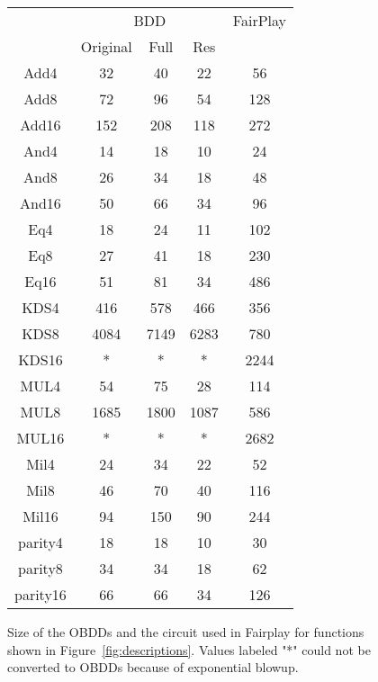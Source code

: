 %
\begin{figure}


\begin{center}\begin{tabular}{|c||c|c|c||c|}
\hline 
&
\multicolumn{3}{c||}{BDD}&
FairPlay\tabularnewline
&
{\sf Original} &
{\sf Full} &
{\sf Res} &
\tabularnewline
\hline
\hline 

Add4 & 32 & 40 & 22 & 56 \tabularnewline \hline
Add8 & 72 & 96 & 54 & 128 \tabularnewline \hline
Add16 & 152 & 208 & 118 & 272 \tabularnewline \hline
And4 & 14 & 18 & 10 & 24 \tabularnewline \hline
And8 & 26 & 34 & 18 & 48 \tabularnewline \hline
And16 & 50 & 66 & 34 & 96 \tabularnewline \hline
Eq4 & 18 & 24 & 11 & 102 \tabularnewline \hline
Eq8 & 27 & 41 & 18 & 230 \tabularnewline \hline
Eq16 & 51 & 81 & 34 & 486 \tabularnewline \hline
KDS4 & 416 & 578 & 466 & 356 \tabularnewline \hline
KDS8 & 4084 & 7149 & 6283 & 780 \tabularnewline \hline
KDS16 & * & * & * & 2244 \tabularnewline \hline
MUL4 & 54 & 75 & 28 & 114 \tabularnewline \hline
MUL8 & 1685 & 1800 & 1087 & 586 \tabularnewline \hline
MUL16 & * & * & * & 2682 \tabularnewline \hline
Mil4 & 24 & 34 & 22 & 52 \tabularnewline \hline
Mil8 & 46 & 70 & 40 & 116 \tabularnewline \hline
Mil16 & 94 & 150 & 90 & 244 \tabularnewline \hline
parity4 & 18 & 18 & 10 & 30 \tabularnewline \hline
parity8 & 34 & 34 & 18 & 62 \tabularnewline \hline
parity16 & 66 & 66 & 34 & 126 \tabularnewline \hline

\hline
\end{tabular}\end{center}
\caption{\label{table:size}Size of the OBDDs and the circuit used in Fairplay for
functions shown in Figure~\ref{fig:descriptions}.  Values labeled "*" could
not be converted to OBDDs because of exponential blowup.}

\end{figure}





